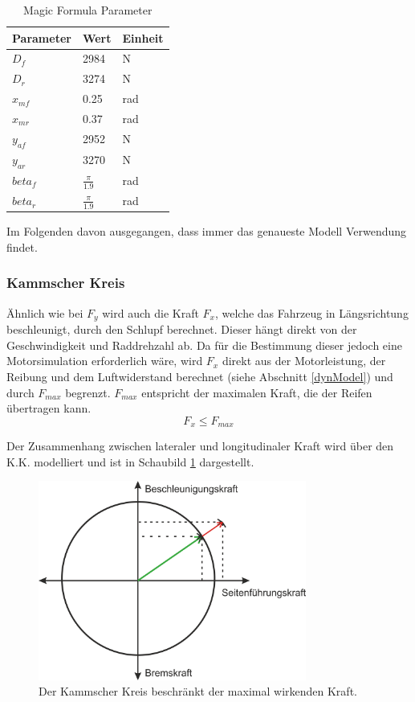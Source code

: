 \documentclass{like}
\begin{document}
\begin{table}[]
	\centering
	\caption{Magic Formula Parameter}
	\begin{tabular}{l|l|l}
		\hline
		Parameter	&  Wert  & Einheit \\ \hline
		\(D_f\)		&  2984 & N \\
		\(D_r\)		&  3274 & N \\
		\(x_{mf}\)	&  0.25 & rad \\
		\(x_{mr}\)	&  0.37 & rad \\
		\(y_{af}\)	&  2952 & N \\
 		\(y_{ar}\)	&  3270 & N \\
		\(beta_{f}\)	&  $\frac{\pi}{1.9}$ & rad \\
		\(beta_{r}\)	&  $\frac{\pi}{1.9}$ & rad \\
		
	\end{tabular}
	
	\label{tireParam}
\end{table}

Im Folgenden davon ausgegangen, dass immer das genaueste Modell Verwendung findet.



\subsubsection*{Kammscher Kreis}

Ähnlich wie bei \(F_y\) wird auch die Kraft \(F_x\), welche das Fahrzeug in Längsrichtung beschleunigt, durch den Schlupf berechnet. Dieser hängt direkt von der Geschwindigkeit und Raddrehzahl ab. Da für die Bestimmung dieser jedoch eine Motorsimulation er\-for\-der\-lich wäre, wird \(F_x\) direkt aus der Motorleistung, der Reibung und dem Luftwiderstand berechnet (siehe Abschnitt \ref{dynModel}) und durch \(F_{max}\) begrenzt. \(F_{max}\) entspricht der maximalen Kraft, die der Reifen übertragen kann.\\
\begin{equation}
F_x \leq F_{max}
\end{equation}

Der Zusammenhang zwischen lateraler und longitudinaler Kraft wird über den \ac{K.K.} modelliert und ist in Schaubild \ref{fig:kamKreis} dargestellt. 

\begin{figure}[ht!]
	\centering
	\includegraphics[width=250pt]{Abbildungen/kamKreis.png}
	\caption{Der Kammscher Kreis beschränkt der maximal wirkenden Kraft.}
	\label{fig:kamKreis}
\end{figure}
\end{document}
